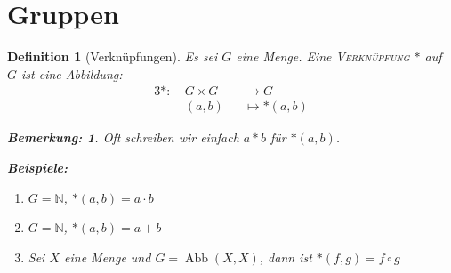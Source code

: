 \documentclass{report}
\newcommand{\N}{\mathbb{N}}
\DeclareMathOperator{\abb}{Abb}
\theoremstyle{customrem}
\newtheorem*{bemerkung}{Bemerkung\textnormal:}
\theoremstyle{customdef}
\newtheorem{definition}{Definition}[chapter]
\theoremstyle{customenv}
\newcommand{\defemph}[1]{\textsc{#1}}
\begin{document}
	\section{Gruppen}

	\begin{definition}[Verknüpfungen]
		Es sei \(G\) eine Menge. Eine \defemph{Verknüpfung} \(\ast\) auf \(G\) ist eine Abbildung:
		\begin{alignat*}{3}
			\ast :\ & G \times G	&&\to G\\
					&(a, b) 		&&\mapsto \ast(a, b)
		\end{alignat*}

		\begin{bemerkung}
			Oft schreiben wir einfach \(a \ast b\) für \(\ast(a, b)\).\\
		\end{bemerkung}

		\textbf{Beispiele:}
		\begin{enumerate}[leftmargin=2cm]
			\itemsep0cm
			\item \(G = \N\), \( \ast(a, b) = a \cdot b\)
			\item \(G = \N\), \( \ast(a, b) = a + b\)
			\item Sei \(X\) eine Menge und \(G = \abb(X, X)\), dann ist \(\ast(f, g) = f \circ g\)
		\end{enumerate}
	\end{definition}
\end{document}
